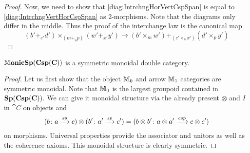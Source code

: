 \documentclass[./Spans_of_cospans_II.tex]{subfiles}
\begin{document}
\begin{proof}
	Now, we need to show that \eqref{diag:IntrchngHorVertCspSpan} is equal to \eqref{diag:IntrchngVertHorCspSpan} as $2$-morphisms.  Note that the diagrams only differ in the middle.  Thus the proof of the interchange law is the canonical map
	\[
	(b'+_{c'}d') \times_{(m+_{n}p)} (w'+_{x'}y')
	\to 
	(b' \times_{m}w')+_{(c'\times_{n}x')}(d'\times_{p}y')
	\]
\end{proof}


\begin{lem}
	\label{lem:SpanCospanSM}
	$\mathbb{M}\mathbf{onicSp(Csp(C))}$ is a symmetric monoidal double category.  
\end{lem}

\begin{proof}
	Let us first show that the object $\mathbb{M}_0$ and arrow $\mathbb{M}_1$ categories are symmetric monoidal.  Note that $\mathbb{M}_0$ is the largest groupoid contained in $\mathbf{Sp(Csp(C))}$. We can give it monoidal structure via the already present $\otimes$ and $I$ in $\cat{C}$ on objects and
	\[
	(b \colon a \xrightarrow{\mathit{sp}} c) \otimes (b' \colon a' \xrightarrow{\mathit{sp}} c')
	=
	(b\otimes b' \colon a\otimes a' \xrightarrow{\mathit{csp}} c\otimes c')
	\]
	on morphisms.  Universal properties provide the associator and unitors as well as the coherence axioms. This monoidal structure is clearly symmetric.
	

\end{proof}
\end{document}
